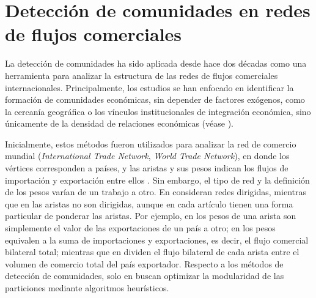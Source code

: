 \section{Detección de comunidades en redes de flujos comerciales}

La detección de comunidades ha sido aplicada desde hace dos décadas como una herramienta para analizar la estructura de las redes de flujos comerciales internacionales. Principalmente, los estudios se han enfocado en identificar la formación de comunidades económicas, sin depender de factores exógenos, como la cercanía geográfica o los vínculos institucionales de integración económica, sino únicamente de la densidad de relaciones económicas (véase \textcite[p.~191]{Tsekeris2017}).

Inicialmente, estos métodos fueron utilizados para analizar la red de comercio mundial (\textit{International Trade Network}, \textit{World Trade Network}), en donde los vértices corresponden a países, y las aristas y sus pesos indican los flujos de importación y exportación entre ellos \textcite{Tzekina2008, Piccardi2012, Reyes2014, Fan2014, Zhu2014, Antonietti2022, Bartesaghi2022}. Sin embargo, el tipo de red y la definición de los pesos varían de un trabajo a otro. En \textcite{Tzekina2008, Piccardi2012} consideran redes dirigidas, mientras que en \textcite{Zhong2014, Fan2014, Reyes2014, Antonietti2022, Bartesaghi2022} las aristas no son dirigidas, aunque en cada artículo tienen una forma particular de ponderar las aristas.  Por ejemplo, en \textcite{Piccardi2012} los pesos de una arista son simplemente el valor de las exportaciones de un país a otro; en \textcite{Zhong2014} los pesos equivalen a la suma de importaciones y exportaciones, es decir, el flujo comercial bilateral total; mientras que en \textcite{Tzekina2008} dividen el flujo bilateral de cada arista entre el volumen de comercio total del país exportador. Respecto a los métodos de detección de comunidades, solo en \textcite{Piccardi2012, Reyes2014, Zhu2014, Fan2014} buscan optimizar la modularidad de las particiones mediante algoritmos heurísticos.

